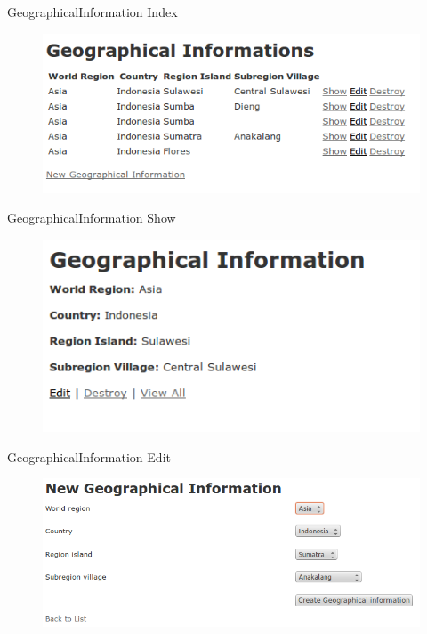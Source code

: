 \documentclass[12pt]{beamer}
\begin{document}

\begin{frame}[fragile]
  \begin{block}{GeographicalInformation Index}
	\begin{figure}
		\includegraphics[scale=0.43]{index.png}
	\end{figure}
  \end{block}
\end{frame}

\begin{frame}[fragile]
  \begin{block}{GeographicalInformation Show}
	\begin{figure}
		\includegraphics[scale=0.43]{show.png}
	\end{figure}
  \end{block}
\end{frame}

\begin{frame}[fragile]
  \begin{block}{GeographicalInformation Edit}
	\begin{figure}
		\includegraphics[scale=0.43]{edit.png}
	\end{figure}
  \end{block}
\end{frame}
\end{document}
